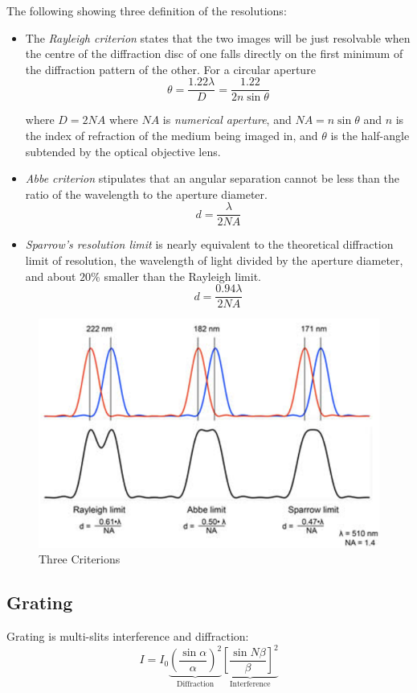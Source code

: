 \documentclass[openany]{book}
\begin{document}
The following showing three definition of the resolutions:
\begin{itemize}
\item The \emph{Rayleigh criterion} states that the two images will be just resolvable when the centre of the diffraction disc of one falls directly on the first minimum of the diffraction pattern of the other. For a circular aperture
\[\theta =\frac{1.22\lambda }{D}=\frac{1.22}{2n\sin \theta }\]

where $D=2NA$ where $NA$ is  \emph{numerical aperture}, and $NA=n\sin \theta $ and $n$ is the index of refraction of the medium being imaged in, and $\theta $ is the half-angle subtended by the optical objective lens.
\item \emph{Abbe criterion} stipulates that an angular separation cannot be less than the ratio of the wavelength to the aperture diameter.
\[d = \frac{\lambda}{2NA}\]

\item \emph{Sparrow's resolution limit} is nearly equivalent to the theoretical diffraction limit of resolution, the wavelength of light divided by the aperture diameter, and about $20\%$ smaller than the Rayleigh limit.
\[d = \frac{0.94\lambda }{2NA}\]
\end{itemize}
\begin{figure}[H]
\centering
\label{fig:Diffraction and Image Resolution1}
\includegraphics[scale=1]{Figure/27.PNG}
\caption{Three Criterions}
\end{figure}

\subsection{Grating}
Grating is multi-slits interference and diffraction:
\[I=I_0\underbrace{\left(\frac{\sin \alpha}{\alpha}\right)^2}_\text{Diffraction}\underbrace{\left[\frac{\sin N\beta }{\beta }\right]^2}_\text{Interference}\]
\end{document}
